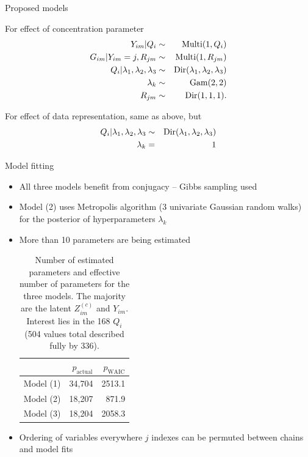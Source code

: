 \documentclass{beamer}
\begin{document}
\begin{frame}{Proposed models}

For effect of concentration parameter
\begin{eqnarray}
Y_{im} | Q_i &\sim& \text{Multi}(1, Q_i)\\
G_{im} | Y_{im} = j, R_{jm} &\sim& \text{Multi}(1, R_{jm}) \notag\\
Q_i | \lambda_1, \lambda_2, \lambda_3 &\sim& \text{Dir}(\lambda_1, \lambda_2, \lambda_3) \notag\\
\lambda_k &\sim& \text{Gam}(2, 2) \notag \\
R_{jm} &\sim& \text{Dir}(1, 1, 1). \notag
\end{eqnarray}

For effect of data representation, same as above, but
\begin{eqnarray}
Q_i | \lambda_1, \lambda_2, \lambda_3 &\sim& \text{Dir}(\lambda_1, \lambda_2, \lambda_3) \\
\lambda_k &=& 1 \notag
\end{eqnarray}

\end{frame}

\begin{frame}{Model fitting}
\begin{itemize}
    \item All three models benefit from conjugacy -- Gibbs sampling used
    \item Model (2) uses Metropolis algorithm (3 univariate Gaussian random walks) for the posterior of hyperparameters $\lambda_k$
    \item More than 10 parameters are being estimated

\begin{table}[]
\centering
\caption{\tiny{Number of estimated parameters and effective number of parameters for the three models. The majority are the latent $Z_{im}^{(c)}$ and $Y_{im}$. Interest lies in the 168 $Q_i$ (504 values total described fully by 336).}}
\label{tab:my-table}
\begin{tabular}{l|rr}
          & $p_\text{actual}$ & $p_\text{WAIC}$ \\
          \hline
Model (1) & 34,704        & 2513.1      \\
Model (2) & 18,207        & 871.9       \\
Model (3) & 18,204        & 2058.3     
\end{tabular}
\end{table}

    \item Ordering of variables everywhere $j$ indexes can be permuted between chains and model fits
\end{itemize}
\end{frame}
\end{document}
